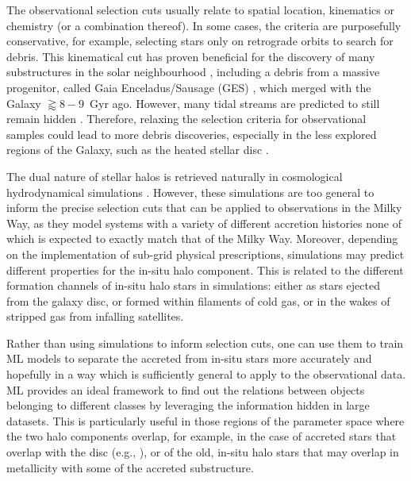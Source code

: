 The observational selection cuts usually relate to spatial location, kinematics or chemistry (or a combination thereof). In some cases, the criteria are purposefully conservative, for example, selecting stars only on retrograde orbits to search for debris. This kinematical cut has proven beneficial for the discovery of many substructures in the solar neighbourhood \citep{Koppelman2019}, including a debris from a massive progenitor, called Gaia Enceladus/Sausage (GES) \citep{Helmi2018,Belokurov2018}, which merged with the Galaxy $\gtrapprox 8-9$~Gyr ago. However, many tidal streams are predicted to still remain hidden  \citep{Shipp2023}. Therefore, relaxing the selection criteria for observational samples could lead to more debris discoveries, especially in the less explored regions of the Galaxy, such as the heated stellar disc \citep{Mackereth2019a,Belokurov2020}.

The dual nature of stellar halos is retrieved naturally in cosmological hydrodynamical simulations \citep{Zolotov2009,McCarthy2012,Tissera2013,Cooper2015,Pillepich2015,Monachesi2016a,Pillepich2018a,Brook2020}. However, these simulations are too general to inform the precise selection cuts that can be applied to observations in the Milky Way, as they model systems with a variety of different accretion histories none of which is expected to exactly match that of the Milky Way. Moreover, depending on the implementation of sub-grid physical prescriptions, simulations may predict different properties for the in-situ halo component. This is related to the different formation channels of in-situ halo stars in simulations: either as stars ejected from the galaxy disc, or formed within filaments of cold gas, or in the wakes of stripped gas from infalling satellites.

Rather than using simulations to inform selection cuts, one can use them to train ML models to separate the accreted from in-situ stars more accurately and hopefully in a way which is sufficiently general to apply to the observational data. ML provides an ideal framework to find out the relations between objects belonging to different classes by leveraging the information hidden in large datasets. This is particularly useful in those regions of the parameter space where the two halo components overlap, for example, in the case of accreted stars that overlap with the disc (e.g., \citealt{Hawkins2015}), or of the old, in-situ halo stars that may overlap in metallicity with some of the accreted substructure.

